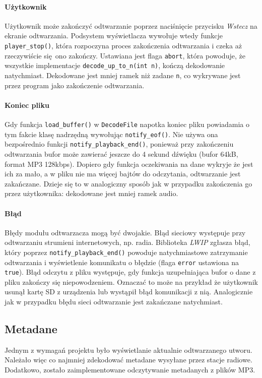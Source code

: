 \documentclass[polish]{aghengthesis}
\begin{document}
			\paragraph{Użytkownik}
				Użytkownik może zakończyć odtwarzanie poprzez naciśnięcie przycisku \textit{Wstecz} na ekranie odtwarzania. Podsystem wyświetlacza wywołuje wtedy funkcje \lstinline|player_stop()|, która rozpoczyna proces zakończenia odtwarzania i czeka aż rzeczywiście się ono zakończy. Ustawiana jest flaga \lstinline|abort|, która powoduje, że wszystkie implementacje \lstinline|decode_up_to_n(int n)|, kończą dekodowanie natychmiast. Dekodowane jest mniej ramek niż zadane \lstinline|n|, co wykrywane jest przez program jako zakończenie odtwarzania.
			
			\paragraph{Koniec pliku}
				Gdy funkcja \lstinline|load_buffer()| w \lstinline|DecodeFile| napotka koniec pliku powiadamia o tym fakcie klasę nadrzędną wywołując \lstinline|notify_eof()|. Nie używa ona bezpośrednio funkcji \lstinline|notify_playback_end()|, ponieważ przy zakończeniu odtwarzania bufor może zawierać jeszcze do 4 sekund dźwięku (bufor 64kB, format MP3 128kbps). Dopiero gdy funkcja oczekiwania na dane wykryje że jest ich za mało, a w pliku nie ma więcej bajtów do odczytania, odtwarzanie jest zakańczane. Dzieje się to w analogiczny sposób jak w przypadku zakończenia go przez użytkownika: dekodowane jest mniej ramek audio.
			
			\paragraph{Błąd}
				Błędy modułu odtwarzacza mogą być dwojakie. Błąd sieciowy występuje przy odtwarzaniu strumieni internetowych, np. radia. Biblioteka \textit{LWIP} zgłasza błąd, który poprzez \lstinline|notify_playback_end()| powoduje natychmiastowe zatrzymanie odtwarzania i wyświetlenie komunikatu o błędzie (flaga \lstinline|error| ustawiona na \lstinline|true|). Błąd odczytu z pliku występuje, gdy funkcja uzupełniająca bufor o dane z pliku zakończy się niepowodzeniem. Oznaczać to może na przykład że użytkownik usunął kartę SD z urządzenia lub wystąpił błąd komunikacji z nią. Analogicznie jak w przypadku błędu sieci odtwarzanie jest zakańczane natychmiast.
			
		\subsection{Metadane}
		Jednym z wymagań projektu było wyświetlanie aktualnie odtwarzanego utworu. Należało więc co najmniej zdekodować metadane wysyłane przez stacje radiowe. Dodatkowo, zostało zaimplementowane odczytywanie metadanych z plików MP3.
		
\end{document}
